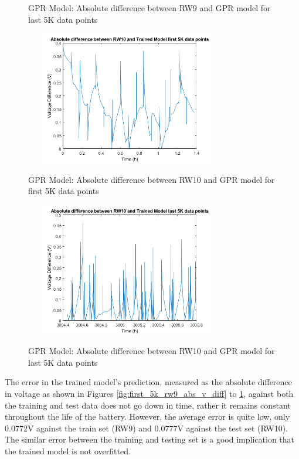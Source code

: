 \begin{figure}
\begin{multicols}{2}
	\caption{GPR Model: Absolute difference between RW9 and GPR model for last 5K data points}
	\label{fig:last_5k_rw9_abs_v_diff}
		\includegraphics[height=2.3in, width=3.5in]{figures/GPR/first_5k_rw10_abs_v_diff}
	\caption{GPR Model: Absolute difference between RW10 and GPR model for first 5K data points}
	\label{fig:first_5k_rw10_abs_v_diff}
	\includegraphics[height=2.3in, width=3.5in]{figures/GPR/last_5k_rw10_abs_v_diff}
	\caption{GPR Model: Absolute difference between RW10 and GPR model for last 5K data points}
	\label{fig:last_5k_rw10_abs_v_diff}
\end{multicols}
\end{figure}

The error in the trained model’s prediction, measured as the absolute difference in voltage as shown in Figures \ref{fig:first_5k_rw9_abs_v_diff} to \ref{fig:last_5k_rw10_abs_v_diff}, against both the training and test data does not go down in time, rather it remains constant throughout the life of the battery.  However, the average error is quite low, only 0.0772V against the train set (RW9) and 0.0777V against the test set (RW10).  The similar error between the training and testing set is a good implication that the trained model is not overfitted.

